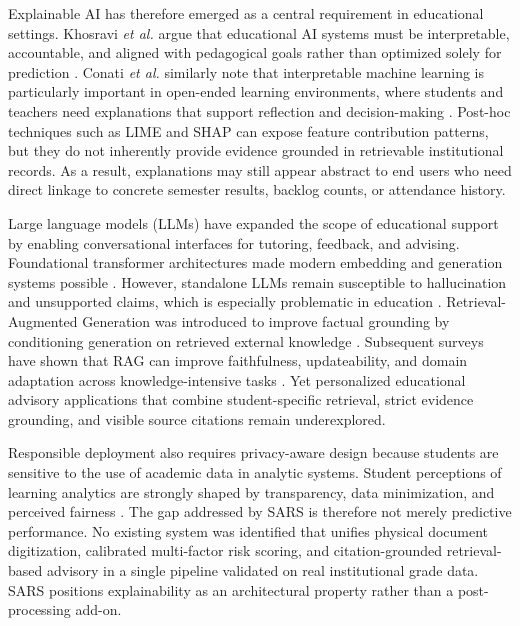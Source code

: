 \documentclass[conference]{IEEEtran}
\begin{document}
Explainable AI has therefore emerged as a central requirement in educational settings. Khosravi \emph{et al.} argue that educational AI systems must be interpretable, accountable, and aligned with pedagogical goals rather than optimized solely for prediction \cite{khosravi2022xai}. Conati \emph{et al.} similarly note that interpretable machine learning is particularly important in open-ended learning environments, where students and teachers need explanations that support reflection and decision-making \cite{conati2018interpretable}. Post-hoc techniques such as LIME and SHAP can expose feature contribution patterns, but they do not inherently provide evidence grounded in retrievable institutional records. As a result, explanations may still appear abstract to end users who need direct linkage to concrete semester results, backlog counts, or attendance history.

Large language models (LLMs) have expanded the scope of educational support by enabling conversational interfaces for tutoring, feedback, and advising. Foundational transformer architectures made modern embedding and generation systems possible \cite{vaswani2017attention,brown2020language}. However, standalone LLMs remain susceptible to hallucination and unsupported claims, which is especially problematic in education \cite{kasneci2023chatgpt}. Retrieval-Augmented Generation was introduced to improve factual grounding by conditioning generation on retrieved external knowledge \cite{lewis2020rag}. Subsequent surveys have shown that RAG can improve faithfulness, updateability, and domain adaptation across knowledge-intensive tasks \cite{gao2023rag}. Yet personalized educational advisory applications that combine student-specific retrieval, strict evidence grounding, and visible source citations remain underexplored.

Responsible deployment also requires privacy-aware design because students are sensitive to the use of academic data in analytic systems. Student perceptions of learning analytics are strongly shaped by transparency, data minimization, and perceived fairness \cite{ifenthaler2016privacy}. The gap addressed by SARS is therefore not merely predictive performance. No existing system was identified that unifies physical document digitization, calibrated multi-factor risk scoring, and citation-grounded retrieval-based advisory in a single pipeline validated on real institutional grade data. SARS positions explainability as an architectural property rather than a post-processing add-on.
\end{document}
